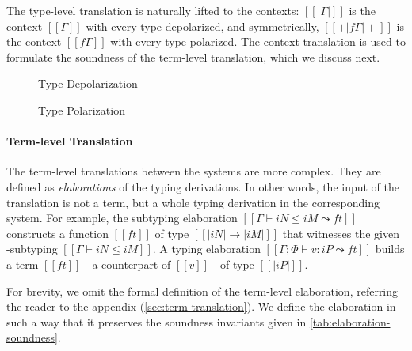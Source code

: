 The type-level translation is naturally lifted to the contexts:
$[[|Γ|]]$ is the context $[[Γ]]$ with every type depolarized,
and symmetrically, $[[+|fΓ|+]]$ is the context $[[fΓ]]$ with every type polarized.
The context translation is used to formulate the soundness of the
 term-level translation, which we discuss next.


\begin{figure}[t]
  \begin{minipage}[t]{0.60\linewidth}
    \centering
      \begin{minipage}[t]{0.30\linewidth}
      \ottfundefnunpolP{}
      \end{minipage}
      \hspace{0.5cm}
      \begin{minipage}[t]{0.30\linewidth}
      \ottfundefnunpolN{}
      \end{minipage}
    \caption{Type Depolarization \protect\footnotemark}
    \label{fig:depolarization}
  \end{minipage}
  \hspace{0.3cm}
  \begin{minipage}[t]{0.3\linewidth}
    \centering
    \ottfundefnpolarP{}
    \caption{Type Polarization}
    \label{fig:polarization}
  \end{minipage}
\end{figure}



\paragraph*{Term-level Translation}

The term-level translations between the systems are more complex. They are
defined as \emph{elaborations} of the typing derivations. In other words, the
input of the translation is not a term, but a whole typing derivation in the
corresponding system. For example, the subtyping elaboration $[[Γ ⊢ iN ≤ iM ⤳
ft]]$ constructs a \systemf function $[[ft]]$ of type $[[|iN| → |iM|]]$ that
witnesses the given \fexists-subtyping $[[Γ ⊢ iN ≤ iM]]$. A typing elaboration
$[[Γ; Φ ⊢ v : iP ⤳ ft]]$ builds a term $[[ft]]$---a \systemf counterpart of
$[[v]]$---of type $[[|iP|]]$.

For brevity, we omit the formal definition of the term-level elaboration,
referring the reader to the appendix (\cref{sec:term-translation}). We define
the elaboration in such a way that it preserves the soundness invariants given
in \cref{tab:elaboration-soundness}. 

